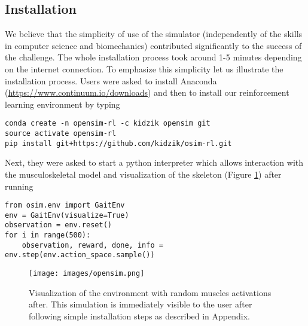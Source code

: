 \documentclass[graybox]{svmult}
\begin{document}
\subsection{Installation}
We believe that the simplicity of use of the simulator (independently of the skills in computer science and biomechanics) contributed significantly to the success of the challenge. The whole installation process took around 1-5 minutes depending on the internet connection. To emphasize this simplicity let us illustrate the installation process.
Users were asked to install Anaconda (\url{https://www.continuum.io/downloads}) and then to install our reinforcement learning environment by typing
\begin{verbatim}
conda create -n opensim-rl -c kidzik opensim git
source activate opensim-rl
pip install git+https://github.com/kidzik/osim-rl.git
\end{verbatim}
Next, they were asked to start a python interpreter which allows interaction with the musculoskeletal model and visualization of the skeleton (Figure \ref{fig:training}) after running
\begin{verbatim}
from osim.env import GaitEnv
env = GaitEnv(visualize=True)
observation = env.reset()
for i in range(500):
    observation, reward, done, info = env.step(env.action_space.sample())
\end{verbatim}

\begin{figure}[ht!]
  \centering
  \texttt{[image: images/opensim.png]}
  \caption{Visualization of the environment with random muscles activations after. This simulation is immediately visible to the user after following simple installation steps as described in Appendix.}
  \label{fig:training}
\end{figure}
\end{document}
